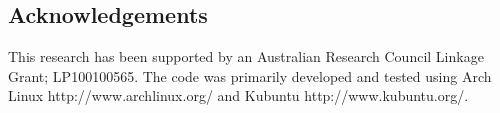 \documentclass[article]{jss}
\begin{document}
\subsection*{Acknowledgements}

This research has been supported by an Australian Research Council
Linkage Grant; \newline LP100100565. The code was primarily developed and
tested using Arch Linux \newline http://www.archlinux.org/ and Kubuntu
http://www.kubuntu.org/.


\end{document}
